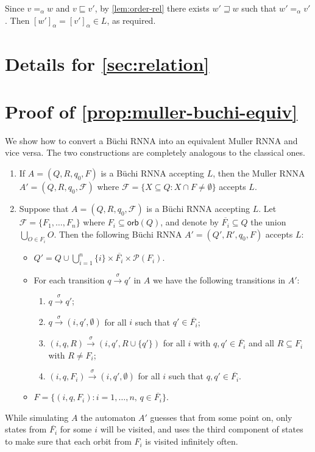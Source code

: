 \documentclass[final,a4paper,UKenglish,thm-restate,autoref,numberwithinsect]{lipics-v2021}
\newcommand{\compr}{:}
\newcommand{\F}{\mathcal{F}}
\numberwithin{equation}{section}
\newcommand{\ol}{\overline}
\newcommand{\xto}[1]{\xrightarrow{~#1~}}
\newcommand{\seq}{\subseteq}
\newcommand{\orb}{\mathsf{orb}}
\newcommand{\+}[1]{\mathcal{#1}\xspace}
\newcommand{\Pow}{\mathcal{P}}
\theoremstyle{definition}
\begin{document}
  Since $v=_\alpha w$ and $v\sqsubseteq v'$, by
  \autoref{lem:order-rel} there exists $w'\sqsupseteq w$ such that
  $w'=_\alpha v'$. Then $[w']_\alpha=[v']_\alpha\in L$, as required.


\section{Details for \autoref{sec:relation}}

\section*{Proof of \autoref{prop:muller-buchi-equiv}}
  We show how to convert a Büchi RNNA into an equivalent Muller RNNA
  and vice versa. The two constructions are completely analogous to the
  classical ones.
  \begin{enumerate}
  \item If $A=(Q,R,q_0,F)$ is a Büchi RNNA accepting $L$, then the
    Muller RNNA $A'=(Q,R,q_0,\F)$ where
    $\F = \{ X\seq Q \compr X\cap F\neq \emptyset \}$ accepts $L$.
    
  \item Suppose that $A=(Q,R,q_0,\F)$ is a Büchi RNNA accepting $L$. Let $\F=\{F_1,\ldots, F_n\}$ where $F_i\seq \orb(Q)$, and denote by $\ol{F_i}\seq Q$ the union $\bigcup_{O\in F_i} O$. Then the following Büchi RNNA $A'=(Q',R',q_0,F)$ accepts $L$:
    \begin{itemize}
    \item $Q' = Q \cup \bigcup_{i=1}^n \{i\}\times \ol{F_i} \times \Pow(F_i)$.
    \item For each transition $q\xto{\sigma} q'$ in $A$ we have the following transitions in $A'$:
      \begin{enumerate}[(1)]
        \setlength{\itemindent}{0.35cm}
      \item $q\xto{\sigma}q'$;
      \item $q\xto{\sigma} (i,q',\emptyset)$ for all $i$ such that $q'\in \ol{F_i}$;
      \item $(i,q,R)\xto{\sigma} (i,q',R\cup \{q'\})$ for all $i$ with
        $q,q'\in \ol{F_i}$ and all $R\seq F_i$ with $R\neq F_i$;
        
      \item $(i,q,F_i)\xto{\sigma} (i,q',\emptyset)$ for all $i$ such that $q,q'\in \ol{F_i}$.
      \end{enumerate}
    \item $F=\{ (i,q, F_i) \compr i=1,\ldots, n, \, q\in \ol{F_i} \}$. 
    \end{itemize} 
  \end{enumerate}
  While simulating $A$ the automaton $A'$ guesses that from some point
  on, only states from $\ol{F_i}$ for some $i$ will be visited, and
  uses the third component of states to make sure that each orbit from
  $F_i$ is visited infinitely often.
\end{document}

